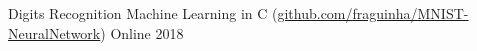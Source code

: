 


\begin{cvhonors}


\cvhonor
  {Digits Recognition} %
  {Machine Learning in C (\href{https://github.com/fraguinha/MNIST-NeuralNetwork}{github.com/fraguinha/MNIST-NeuralNetwork})} %
  {Online} %
  {2018} %

\end{cvhonors}
